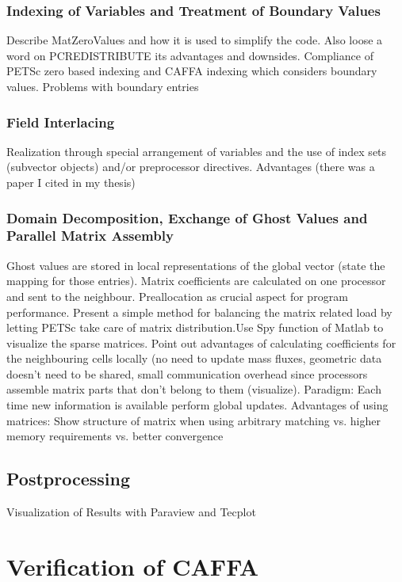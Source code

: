 \documentclass[article,type=msc,colorback,accentcolor=tud2a]{tudthesis}
\begin{document}
      \subsubsection{Indexing of Variables and Treatment of Boundary Values}
      Describe MatZeroValues and how it is used to simplify the code. Also loose a word on PCREDISTRIBUTE its advantages and downsides. Compliance of PETSc zero based indexing and CAFFA indexing which considers boundary values. Problems with boundary entries
      \subsubsection{Field Interlacing}
      Realization through special arrangement of variables and the use of index sets (subvector objects) and/or preprocessor directives. Advantages (there was a paper I cited in my thesis)
      \subsubsection{Domain Decomposition, Exchange of Ghost Values and Parallel Matrix Assembly}

      Ghost values are stored in local representations of the global vector (state the mapping for those entries). Matrix coefficients are calculated on one processor and sent to the neighbour. Preallocation as crucial aspect for program performance. Present a simple method for balancing the matrix related load by letting PETSc take care of matrix distribution.Use Spy function of Matlab to visualize the sparse matrices. Point out advantages of calculating coefficients for the neighbouring cells locally (no need to update mass fluxes, geometric data doesn't need to be shared, small communication overhead since processors assemble matrix parts that don't belong to them (visualize). Paradigm: Each time new information is available perform global updates. Advantages of using matrices: Show structure of matrix when using arbitrary matching vs. higher memory requirements vs. better convergence

    \subsection{Postprocessing}
    
      Visualization of Results with Paraview and Tecplot

  \section{Verification of CAFFA}
    
\end{document}
